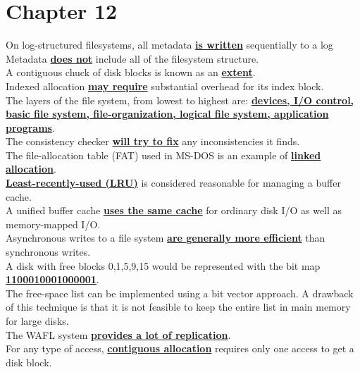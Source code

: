\documentclass[10pt]{article}
\newcommand{\qw}[1]{\textbf{\ul{#1}}}
\begin{document}
\section*{\centering Chapter 12}
On log-structured filesystems, all metadata \qw{is written} sequentially to a log\\[2mm]
Metadata \qw{does not} include all of the filesystem structure.\\[2mm]
A contiguous chuck of disk blocks is known as an \qw{extent}.\\[2mm]
Indexed allocation \qw{may require} substantial overhead for its index block.\\[2mm]
The layers of the file system, from lowest to highest are: \qw{devices, I/O control, basic file system, file-organization, logical file system, application programs}.\\[2mm]
The consistency checker \qw{will try to fix} any inconsistencies it finds.\\[2mm]
The file-allocation table (FAT) used in MS-DOS is an example of \qw{linked allocation}.\\[2mm]
\qw{Least-recently-used (LRU)} is considered reasonable for managing a buffer cache.\\[2mm]
A unified buffer cache \qw{uses the same cache} for ordinary disk I/O as well as memory-mapped I/O.\\[2mm]
Asynchronous writes to a file system \qw{are generally more efficient} than synchronous writes.\\[2mm]
A disk with free blocks 0,1,5,9,15 would be represented with the bit map \qw{1100010001000001}.\\[2mm]
The free-space list can be implemented using a bit vector approach.
A drawback of this technique is that it is not feasible to keep the entire list
in main memory for large disks.\\[2mm]
The WAFL system \qw{provides a lot of replication}.\\[2mm]
For any type of access, \qw{contiguous allocation} requires only one access to get a disk block.
\end{document}
